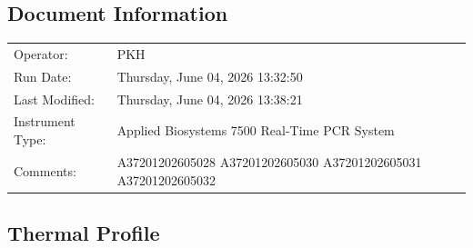 \documentclass[UTF8,10pt,a4paper,fontset=fandol]{ctexart}
\newcommand{\fieldvalue}[1]{#1}
\begin{document}
\subsection{Document Information}

\begin{tabular}{@{}ll@{}}
Operator:
&
\fieldvalue{PKH}
\\
Run Date:
&
\fieldvalue{Thursday, June 04, 2026 13:32:50}
\\
Last Modified:
&
\fieldvalue{Thursday, June 04, 2026 13:38:21}
\\
Instrument Type:
&
\fieldvalue{Applied Biosystems 7500 Real-Time PCR System}
\\
Comments:
&
\fieldvalue{A37201202605028 A37201202605030 A37201202605031 A37201202605032}
\end{tabular}

\subsection{Thermal Profile}
\end{document}
